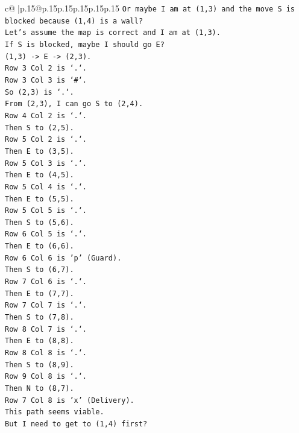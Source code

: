 \documentclass{article}
\begin{document}
{\begin{supertabular}{c@{$\;$}|p{.15\linewidth}@{}p{.15\linewidth}p{.15\linewidth}p{.15\linewidth}p{.15\linewidth}p{.15\linewidth}}
{{{\texttt{Or maybe I am at (1,3) and the move S is blocked because (1,4) is a wall?} \\
\texttt{Let's assume the map is correct and I am at (1,3).} \\
\texttt{If S is blocked, maybe I should go E?} \\
\texttt{(1,3) {-}> E {-}> (2,3).} \\
\texttt{Row 3 Col 2 is `.`.} \\
\texttt{Row 3 Col 3 is `\#`.} \\
\texttt{So (2,3) is `.`.} \\
\texttt{From (2,3), I can go S to (2,4).} \\
\texttt{Row 4 Col 2 is `.`.} \\
\texttt{Then S to (2,5).} \\
\texttt{Row 5 Col 2 is `.`.} \\
\texttt{Then E to (3,5).} \\
\texttt{Row 5 Col 3 is `.`.} \\
\texttt{Then E to (4,5).} \\
\texttt{Row 5 Col 4 is `.`.} \\
\texttt{Then E to (5,5).} \\
\texttt{Row 5 Col 5 is `.`.} \\
\texttt{Then S to (5,6).} \\
\texttt{Row 6 Col 5 is `.`.} \\
\texttt{Then E to (6,6).} \\
\texttt{Row 6 Col 6 is 'p' (Guard).} \\
\texttt{Then S to (6,7).} \\
\texttt{Row 7 Col 6 is `.`.} \\
\texttt{Then E to (7,7).} \\
\texttt{Row 7 Col 7 is `.`.} \\
\texttt{Then S to (7,8).} \\
\texttt{Row 8 Col 7 is `.`.} \\
\texttt{Then E to (8,8).} \\
\texttt{Row 8 Col 8 is `.`.} \\
\texttt{Then S to (8,9).} \\
\texttt{Row 9 Col 8 is `.`.} \\
\texttt{Then N to (8,7).} \\
\texttt{Row 7 Col 8 is 'x' (Delivery).} \\
\texttt{This path seems viable.} \\
\texttt{But I need to get to (1,4) first?} \\
}}}
\end{supertabular}}
\end{document}
